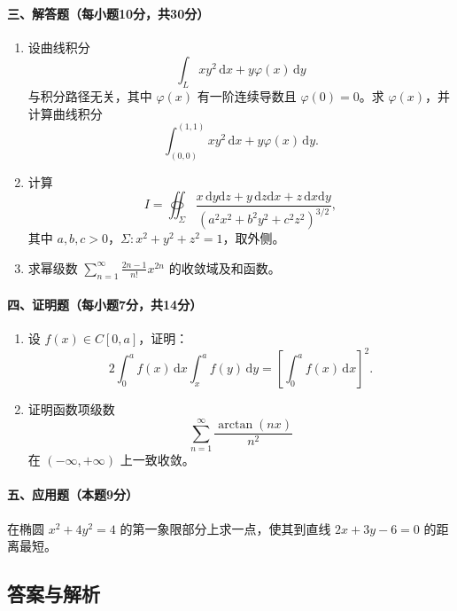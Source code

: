 \paragraph*{三、解答题（每小题10分，共30分）}
\begin{enumerate}
  \item 设曲线积分
  \[
    \int_L xy^2\,\mathrm{d}x+y\varphi(x)\,\mathrm{d}y
  \]
  与积分路径无关，其中 \(\varphi(x)\) 有一阶连续导数且 \(\varphi(0)=0\)。求 \(\varphi(x)\)，并计算曲线积分
  \[
    \int_{(0,0)}^{(1,1)}xy^2\,\mathrm{d}x+y\varphi(x)\,\mathrm{d}y.
  \]

  \item 计算
  \[
    I=\oiint_\Sigma
    \frac{x\,\mathrm{d}y\mathrm{d}z+y\,\mathrm{d}z\mathrm{d}x+z\,\mathrm{d}x\mathrm{d}y}
    {(a^2x^2+b^2y^2+c^2z^2)^{3/2}},
  \]
  其中 \(a,b,c>0\)，\(\Sigma:x^2+y^2+z^2=1\)，取外侧。

  \item 求幂级数 \(\displaystyle \sum_{n=1}^{\infty}\frac{2n-1}{n!}x^{2n}\) 的收敛域及和函数。
\end{enumerate}

\paragraph*{四、证明题（每小题7分，共14分）}
\begin{enumerate}
  \item 设 \(f(x)\in C[0,a]\)，证明：
  \[
    2\int_0^a f(x)\,\mathrm{d}x\int_x^a f(y)\,\mathrm{d}y
    =\left[\int_0^a f(x)\,\mathrm{d}x\right]^2.
  \]
  \item 证明函数项级数
  \[
    \sum_{n=1}^{\infty}\frac{\arctan(nx)}{n^2}
  \]
  在 \((-\infty,+\infty)\) 上一致收敛。
\end{enumerate}

\paragraph*{五、应用题（本题9分）}
在椭圆 \(x^2+4y^2=4\) 的第一象限部分上求一点，使其到直线 \(2x+3y-6=0\) 的距离最短。

\subsection{答案与解析}

